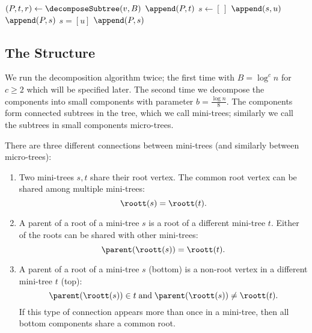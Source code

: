\begin{algorithm}
\begin{algorithmic}
	\State $(P, t, r) \gets \decomposeSubtree(v, B)$ 
	 
			\State $\append(P, t)$ 
		\Else {}
			\State $s \gets [\,]$
			 
				\State $\append(s, u)$
				 
					\State $\append(P, s)$%
					\Instr $s = [u]$ 
				\EndIf
			\EndFor
			\State $\append(P, s)$ 
		\EndIf
	\EndIf
	\State {}
\EndFunction
\end{algorithmic}
\end{algorithm}

\subsection{The Structure}

We run the decomposition algorithm twice; the first time with $B = \log^c n$ for $c \ge 2$ which will be specified later.
The second time we decompose the components into small components with parameter $b = \frac{\log n}{8}$.
The components form connected subtrees in the tree, which we call mini-trees; similarly we call the subtrees in small components micro-trees.

There are three different connections between mini-trees (and similarly between micro-trees):
\begin{enumerate}
	\item Two mini-trees $s, t$ share their root vertex.
	The common root vertex can be shared among multiple mini-trees:
	$$\roott(s) = \roott(t).$$

	\item A parent of a root of a mini-tree $s$ is a root of a different mini-tree $t$.
	Either of the roots can be shared with other mini-trees:
	$$\parent(\roott(s)) = \roott(t).$$

	\item A parent of a root of a mini-tree $s$ (bottom) is a non-root vertex in a different mini-tree $t$ (top):
	$$\parent(\roott(s)) \in t \booland \parent(\roott(s)) \ne \roott(t).$$
	If this type of connection appears more than once in a mini-tree, then all bottom components share a common root.
\end{enumerate}

